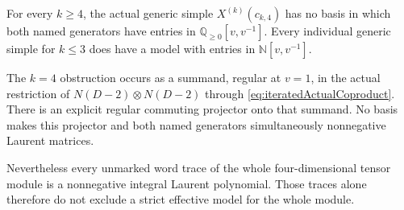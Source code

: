 \begin{finding}
\label{f:iteratedChebyshevGate}
For every \(k\ge4\), the actual generic simple
\(X^{(k)}(c_{k,4})\) has no basis in which both named
generators have entries in \(\mathbb Q_{\ge0}[v,v^{-1}]\).
Every individual generic simple for \(k\le3\) does have
a model with entries in \(\mathbb N[v,v^{-1}]\).

The \(k=4\) obstruction occurs as a summand, regular at \(v=1\),
in the actual restriction of \(N(D-2)\otimes N(D-2)\)
through \eqref{eq:iteratedActualCoproduct}.
There is an explicit regular commuting projector onto that
summand. No basis makes this projector and both named generators
simultaneously nonnegative Laurent matrices.

Nevertheless every unmarked word trace of the whole
four-dimensional tensor module is a nonnegative integral Laurent
polynomial. Those traces alone therefore do not exclude a
strict effective model for the whole module.
\end{finding}

